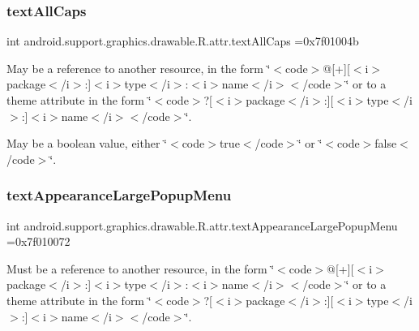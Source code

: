 \subsubsection{\texorpdfstring{text\+All\+Caps}{textAllCaps}}
{\footnotesize\ttfamily int android.\+support.\+graphics.\+drawable.\+R.\+attr.\+text\+All\+Caps =0x7f01004b\hspace{0.3cm}{\ttfamily [static]}}

May be a reference to another resource, in the form \char`\"{}$<$code$>$@\mbox{[}+\mbox{]}\mbox{[}$<$i$>$package$<$/i$>$\+:\mbox{]}$<$i$>$type$<$/i$>$\+:$<$i$>$name$<$/i$>$$<$/code$>$\char`\"{} or to a theme attribute in the form \char`\"{}$<$code$>$?\mbox{[}$<$i$>$package$<$/i$>$\+:\mbox{]}\mbox{[}$<$i$>$type$<$/i$>$\+:\mbox{]}$<$i$>$name$<$/i$>$$<$/code$>$\char`\"{}. 

May be a boolean value, either \char`\"{}$<$code$>$true$<$/code$>$\char`\"{} or \char`\"{}$<$code$>$false$<$/code$>$\char`\"{}. \mbox{\label{classandroid_1_1support_1_1graphics_1_1drawable_1_1R_1_1attr_ac41c26e56c3d24c8b3cd1c00adb1de7a}} 
\subsubsection{\texorpdfstring{text\+Appearance\+Large\+Popup\+Menu}{textAppearanceLargePopupMenu}}
{\footnotesize\ttfamily int android.\+support.\+graphics.\+drawable.\+R.\+attr.\+text\+Appearance\+Large\+Popup\+Menu =0x7f010072\hspace{0.3cm}{\ttfamily [static]}}

Must be a reference to another resource, in the form \char`\"{}$<$code$>$@\mbox{[}+\mbox{]}\mbox{[}$<$i$>$package$<$/i$>$\+:\mbox{]}$<$i$>$type$<$/i$>$\+:$<$i$>$name$<$/i$>$$<$/code$>$\char`\"{} or to a theme attribute in the form \char`\"{}$<$code$>$?\mbox{[}$<$i$>$package$<$/i$>$\+:\mbox{]}\mbox{[}$<$i$>$type$<$/i$>$\+:\mbox{]}$<$i$>$name$<$/i$>$$<$/code$>$\char`\"{}. \mbox{\label{classandroid_1_1support_1_1graphics_1_1drawable_1_1R_1_1attr_a4af0c27a177bf8bcc4d19b39996021ef}} 

